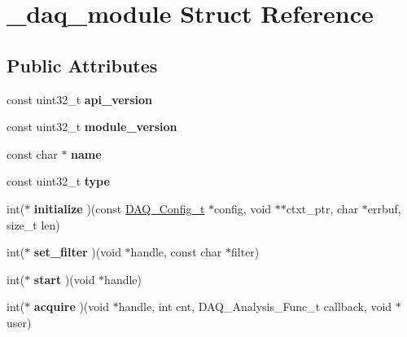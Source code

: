 \hypertarget{struct__daq__module}{
\section{\_\-daq\_\-module Struct Reference}
\label{struct__daq__module}
}
\subsection*{Public Attributes}
\begin{DoxyCompactItemize}
\item 
\hypertarget{struct__daq__module_ae66fb10d74f8ed34ffb7b6703af1f5c0}{
const uint32\_\-t {\bfseries api\_\-version}}
\label{struct__daq__module_ae66fb10d74f8ed34ffb7b6703af1f5c0}

\item 
\hypertarget{struct__daq__module_abab58bd264751c6f0cc0636f4c53b7cd}{
const uint32\_\-t {\bfseries module\_\-version}}
\label{struct__daq__module_abab58bd264751c6f0cc0636f4c53b7cd}

\item 
\hypertarget{struct__daq__module_a013f4cc97a06604f5c8706d8d5769346}{
const char $\ast$ {\bfseries name}}
\label{struct__daq__module_a013f4cc97a06604f5c8706d8d5769346}

\item 
\hypertarget{struct__daq__module_a422dc0a0277452b5d90ff37e37cfb2d4}{
const uint32\_\-t {\bfseries type}}
\label{struct__daq__module_a422dc0a0277452b5d90ff37e37cfb2d4}

\item 
\hypertarget{struct__daq__module_ae63d6d47f5af9a84f409146d4840ea60}{
int($\ast$ {\bfseries initialize} )(const \hyperlink{struct__daq__config}{DAQ\_\-Config\_\-t} $\ast$config, void $\ast$$\ast$ctxt\_\-ptr, char $\ast$errbuf, size\_\-t len)}
\label{struct__daq__module_ae63d6d47f5af9a84f409146d4840ea60}

\item 
\hypertarget{struct__daq__module_a5c0a73a3399621f95d40f401685e8ba8}{
int($\ast$ {\bfseries set\_\-filter} )(void $\ast$handle, const char $\ast$filter)}
\label{struct__daq__module_a5c0a73a3399621f95d40f401685e8ba8}

\item 
\hypertarget{struct__daq__module_a031005236478fbc0c0549015c4659b9c}{
int($\ast$ {\bfseries start} )(void $\ast$handle)}
\label{struct__daq__module_a031005236478fbc0c0549015c4659b9c}

\item 
\hypertarget{struct__daq__module_a83a0026cd37fe3ef41f77c3ad098574e}{
int($\ast$ {\bfseries acquire} )(void $\ast$handle, int cnt, DAQ\_\-Analysis\_\-Func\_\-t callback, void $\ast$user)}
\label{struct__daq__module_a83a0026cd37fe3ef41f77c3ad098574e}


\end{DoxyCompactItemize}
